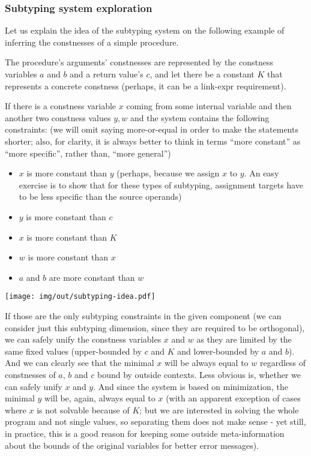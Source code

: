 \subsubsection{Subtyping system exploration}
\label{subtyping-idea}

Let us explain the idea of the subtyping system on the following example of inferring the constnesses of a simple procedure.

The procedure's arguments' constnesses are represented by the constness variables $a$ and $b$ and a return value's $c$, and let there be a constant $K$ that represents a concrete constness (perhaps, it can be a link-expr requirement).

If there is a constness variable $x$ coming from some internal variable and then another two constness values $y, w$ and the system contains the following constraints: (we will omit saying more-or-equal in order to make the statements shorter; also, for clarity, it is always better to think in terms ``more constant'' as ``more specific'', rather than, ``more general'')

\begin{itemize}
    \item $x$ is more constant than $y$ (perhaps, because we assign $x$ to $y$. An easy exercise is to show that for these types of subtyping, assignment targets have to be less specific than the source operands)
    \item $y$ is more constant than $c$
    \item $x$ is more constant than $K$
    \item $w$ is more constant than $x$
    \item $a$ and $b$ are more constant than $w$
\end{itemize}

\centerline{\texttt{[image: img/out/subtyping-idea.pdf]}}

If those are the only subtyping constraints in the given component (we can consider just this subtyping dimension, since they are required to be orthogonal), we can safely unify the constness variables $x$ and $w$ as they are limited by the same fixed values (upper-bounded by $c$ and $K$ and lower-bounded by $a$ and $b$). And we can clearly see that the minimal $x$ will be always equal to $w$ regardless of constnesses of $a$, $b$ and $c$ bound by outside contexts. Less obvious is, whether we can safely unify $x$ and $y$. And since the system is based on minimization, the minimal $y$ will be, again, always equal to $x$ (with an apparent exception of cases where $x$ is not solvable because of $K$; but we are interested in solving the whole program and not single values, so separating them does not make sense - yet still, in practice, this is a good reason for keeping some outside meta-information about the bounds of the original variables for better error messages).

